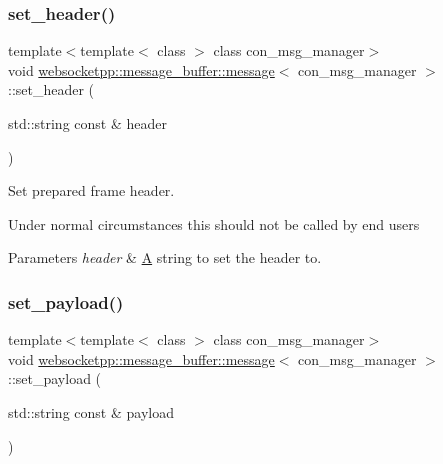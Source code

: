 \subsubsection{\texorpdfstring{set\+\_\+header()}{set\_header()}}
{\footnotesize\ttfamily template$<$template$<$ class $>$ class con\+\_\+msg\+\_\+manager$>$ \\
void \mbox{\hyperlink{classwebsocketpp_1_1message__buffer_1_1message}{websocketpp\+::message\+\_\+buffer\+::message}}$<$ con\+\_\+msg\+\_\+manager $>$\+::set\+\_\+header (\begin{DoxyParamCaption}\item[{std\+::string const \&}]{header }\end{DoxyParamCaption})\hspace{0.3cm}{\ttfamily [inline]}}



Set prepared frame header. 

Under normal circumstances this should not be called by end users


\begin{DoxyParams}{Parameters}
{\em header} & \mbox{\hyperlink{struct_a}{A}} string to set the header to. \\
\hline
\end{DoxyParams}
\mbox{\label{classwebsocketpp_1_1message__buffer_1_1message_a349d38ec257bde2f6f657cb31af80ced}} 
\subsubsection{\texorpdfstring{set\+\_\+payload()}{set\_payload()}\hspace{0.1cm}{\footnotesize\ttfamily [1/2]}}
{\footnotesize\ttfamily template$<$template$<$ class $>$ class con\+\_\+msg\+\_\+manager$>$ \\
void \mbox{\hyperlink{classwebsocketpp_1_1message__buffer_1_1message}{websocketpp\+::message\+\_\+buffer\+::message}}$<$ con\+\_\+msg\+\_\+manager $>$\+::set\+\_\+payload (\begin{DoxyParamCaption}\item[{std\+::string const \&}]{payload }\end{DoxyParamCaption})\hspace{0.3cm}{\ttfamily [inline]}}



